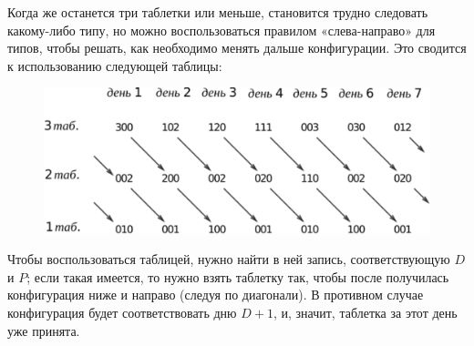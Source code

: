 Когда же останется три таблетки или меньше, становится трудно следовать какому-либо типу, но можно воспользоваться правилом «слева-направо» для типов, чтобы решать, как необходимо менять дальше конфигурации.
Это сводится к использованию следующей таблицы:

\begin{figure}[h!]
\centering
\includegraphics[scale=0.6]{Figs/Handicaps/3box-ru}
\end{figure}

Чтобы воспользоваться таблицей, нужно найти в ней запись, соответствующую $D$ и $P$;
если такая имеется, то нужно взять таблетку так, чтобы после получилась конфигурация ниже и направо (следуя по диагонали).
В противном случае конфигурация будет соответствовать дню $D+1$, и, значит, таблетка за этот день уже принята.
